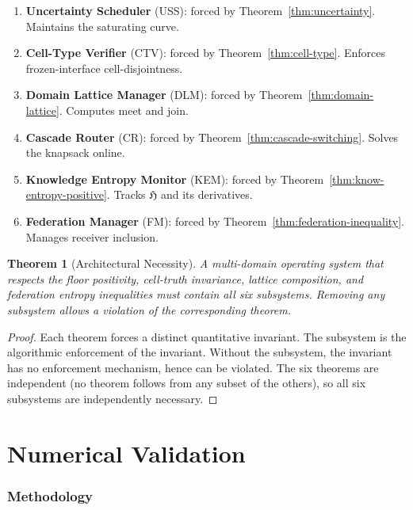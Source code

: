 \documentclass[twocolumn,11pt,a4paper]{article}
\newtheorem{theorem}{Theorem}[section]
\newcommand{\Hknow}{\mathfrak{H}}
\begin{document}
\begin{enumerate}[nosep,leftmargin=*]
\item \textbf{Uncertainty Scheduler} (USS): forced by Theorem~\ref{thm:uncertainty}. Maintains the saturating curve.
\item \textbf{Cell-Type Verifier} (CTV): forced by Theorem~\ref{thm:cell-type}. Enforces frozen-interface cell-disjointness.
\item \textbf{Domain Lattice Manager} (DLM): forced by Theorem~\ref{thm:domain-lattice}. Computes meet and join.
\item \textbf{Cascade Router} (CR): forced by Theorem~\ref{thm:cascade-switching}. Solves the knapsack online.
\item \textbf{Knowledge Entropy Monitor} (KEM): forced by Theorem~\ref{thm:know-entropy-positive}. Tracks $\Hknow$ and its derivatives.
\item \textbf{Federation Manager} (FM): forced by Theorem~\ref{thm:federation-inequality}. Manages receiver inclusion.
\end{enumerate}

\begin{theorem}[Architectural Necessity]
\label{thm:arch-necessity}
A multi-domain operating system that respects the floor positivity, cell-truth invariance, lattice composition, and federation entropy inequalities must contain all six subsystems. Removing any subsystem allows a violation of the corresponding theorem.
\end{theorem}

\begin{proof}
Each theorem forces a distinct quantitative invariant. The subsystem is the algorithmic enforcement of the invariant. Without the subsystem, the invariant has no enforcement mechanism, hence can be violated. The six theorems are independent (no theorem follows from any subset of the others), so all six subsystems are independently necessary.
\end{proof}

\part{Numerical Validation}

\section{Methodology}
\label{sec:val-methodology}
\end{document}
